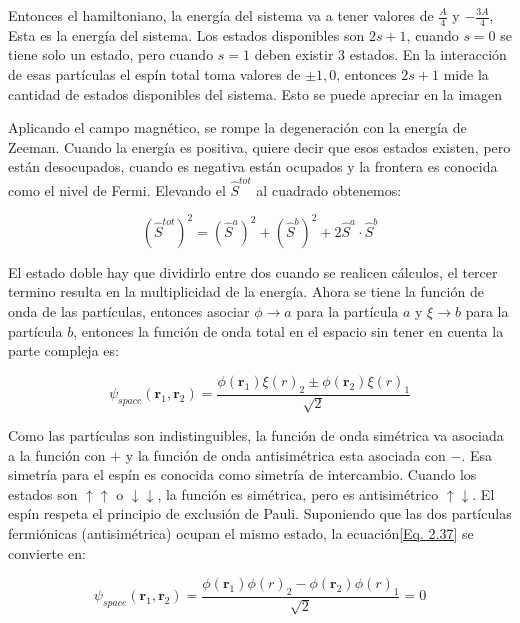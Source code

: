 \documentclass[11pt,fleqn]{book}
\renewcommand{\vec}[1]{\mathbf{#1}}
\begin{document}
Entonces el hamiltoniano, la energía del sistema va a tener valores de $\frac{A}{4}$ y $-\frac{3A}{4}$, Esta es la energía del sistema. Los estados disponibles son $2s+1$, cuando $s=0$ se tiene solo un estado, pero cuando $s=1$ deben existir 3 estados. En la interacción de esas partículas el espín total toma valores de $\pm 1, 0$, entonces $2s+1$ mide la cantidad de estados disponibles del sistema. Esto se puede apreciar en la imagen


Aplicando el campo magnético, se rompe la degeneración con la energía de Zeeman. Cuando la energía es positiva, quiere decir que esos estados existen, pero están desocupados, cuando es negativa están ocupados y la frontera es conocida como el nivel de Fermi. Elevando el $\hat{S}^{tot}$ al cuadrado obtenemos:

\begin{equation*}
    \left(\hat{S}^{tot}\right)^{2}=\left(\hat{S}^{a}\right)^{2}+\left(\hat{S}^{b}\right)^{2}+2\hat{S}^{a}\cdot\hat{S}^{b}
\end{equation*}
 
El estado doble hay que dividirlo entre dos cuando se realicen cálculos, el tercer termino resulta en la multiplicidad de la energía. Ahora se tiene la función de onda de las partículas, entonces asociar $\phi \rightarrow a$ para la partícula $a$ y $\xi \rightarrow b$ para la partícula $b$, entonces la función de onda total en el espacio sin tener en cuenta la parte compleja es:

\begin{equation}
    \psi_{space}(\vec{r}_{1},\vec{r}_{2})=\frac{\phi(\vec{r}_{1})\xi(r)_{2}\pm\phi(\vec{r}_{2})\xi(r)_{1}}{\sqrt{2}}
    \label{Eq. 2.37}
\end{equation}

Como las partículas son indistinguibles, la función de onda simétrica va asociada a la función con $+$ y la función de onda antisimétrica esta asociada con $-$. Esa simetría para el espín es conocida como simetría de intercambio. Cuando los estados son $\uparrow\uparrow$ o $\downarrow\downarrow$, la función es simétrica, pero es antisimétrico $\uparrow\downarrow$. El espín respeta el principio de exclusión de Pauli. Suponiendo que las dos partículas fermiónicas (antisimétrica) ocupan el mismo estado, la ecuación\ref{Eq. 2.37} se convierte en:

\begin{equation*}
       \psi_{space}(\vec{r}_{1},\vec{r}_{2})=\frac{\phi(\vec{r}_{1})\phi(r)_{2}-\phi(\vec{r}_{2})\phi(r)_{1}}{\sqrt{2}}=0
\end{equation*}
\end{document}
